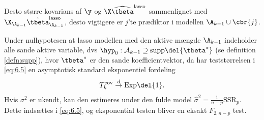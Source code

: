 Desto større kovarians af \(\y\) og \(\X \widehat{\tbeta}^\text{lasso}\) sammenlignet med \(\X_{\A_{k-1}} \tilde{\tbeta}^\text{lasso}_{\A_{k-1}}\), desto vigtigere er \(j\)'te prædiktor i modellen \(\A_{k-1} \cup \cbr{j}\).

Under nulhypotesen at lasso modellen med den aktive mængde \(\A_{k-1}\) indeholder alle sande aktive variable, dvs \(\hyp_0: \mathcal{A}_{k-1} \supseteq \text{supp} \del{\tbeta^*}\) (se definition \ref{defn:supp}), hvor \(\tbeta^*\) er den sande koefficientvektor, da har teststørrelsen i \eqref{eq:6.5} en asymptotisk standard eksponentiel fordeling
\begin{align*}
T_k^\text{cov} \overset{d}{\rightarrow} \text{Exp}\del{1}.
\end{align*}
Hvis \(\sigma^2\) er ukendt, kan den estimeres under den fulde model \(\widehat{\sigma}^2 = \frac{1}{n-p} \text{SSR}_p\). 
Dette indsættes i \eqref{eq:6.5}, og eksponential testen bliver en eksakt \(F_{2,n-p}\) test. \\
%
